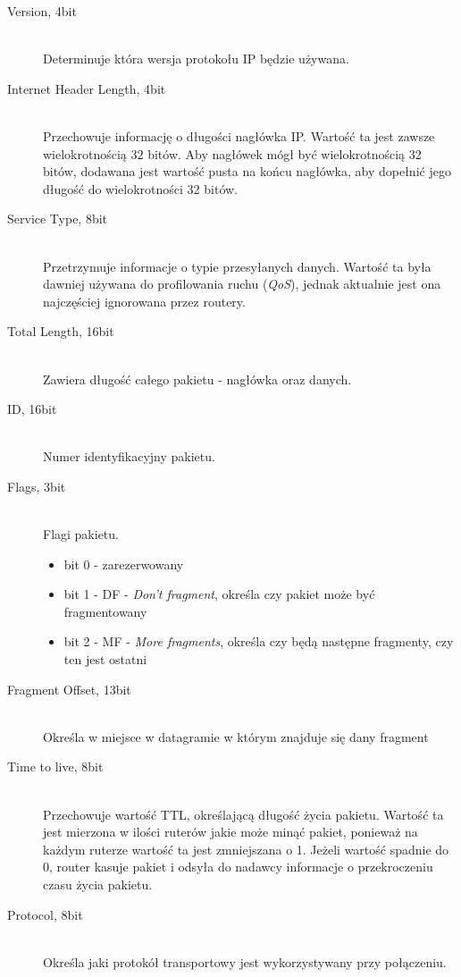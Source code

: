 \documentclass[a4paper,12pt,oneside]{book}
\begin{document}
			\begin{description}
			\item[Version, 4bit]\hfill\\
				Determinuje która wersja protokołu IP będzie używana.
			\item[Internet Header Length, 4bit]\hfill\\
				Przechowuje informację o długości nagłówka IP.
				Wartość ta jest zawsze wielokrotnością 32 bitów.
				Aby nagłówek mógł być wielokrotnością 32 bitów, dodawana jest wartość pusta na końcu nagłówka, aby dopełnić jego długość do wielokrotności 32 bitów.
			\item[Service Type, 8bit]\hfill \\
				Przetrzymuje informacje o typie przesyłanych danych.
				Wartość ta była dawniej używana do profilowania ruchu (\textit{QoS}), jednak aktualnie jest ona najczęściej ignorowana przez routery.
			\item[Total Length, 16bit]\hfill \\
				Zawiera długość całego pakietu - nagłówka oraz danych.
			\item[ID, 16bit]\hfill \\
				Numer identyfikacyjny pakietu.
			\item[Flags, 3bit]\hfill\\
				Flagi pakietu.
				\begin{itemize}
					\item bit 0 - zarezerwowany
					\item bit 1 - DF - \textit{Don't fragment}, określa czy pakiet może być fragmentowany
					\item bit 2 - MF - \textit{More fragments}, określa czy będą następne fragmenty, czy ten jest ostatni
				\end{itemize}
			\item[Fragment Offset, 13bit]\hfill\\
				Określa w miejsce w datagramie w którym znajduje się dany fragment
			\item[Time to live, 8bit]\hfill\\
				Przechowuje wartość TTL, określającą długość życia pakietu.
				Wartość ta jest mierzona w ilości ruterów jakie może minąć pakiet, ponieważ na każdym ruterze wartość ta jest zmniejszana o 1.
				Jeżeli wartość spadnie do 0, router kasuje pakiet i odsyła do nadawcy informacje o przekroczeniu czasu życia pakietu.
			\item[Protocol, 8bit]\hfill\\
				Określa jaki protokół transportowy jest wykorzystywany przy połączeniu.

\end{description}
\end{document}

